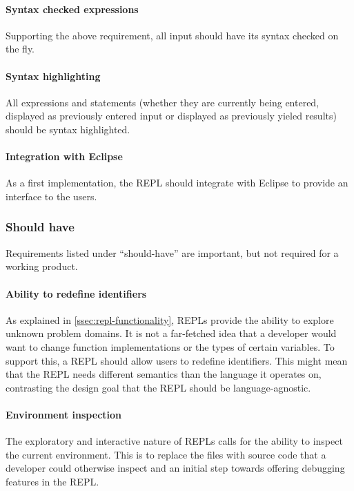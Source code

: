 \paragraph{Syntax checked expressions} Supporting the above requirement, all
input should have its syntax checked on the fly.

\paragraph{Syntax highlighting} All expressions and statements (whether they are
currently being entered, displayed as previously entered input or displayed as
previously yieled results) should be syntax highlighted.

\paragraph{Integration with Eclipse} As a first implementation, the REPL should
integrate with Eclipse to provide an interface to the users.

\subsubsection{Should have}

Requirements listed under ``should-have'' are important, but not required for
a working product.

\paragraph{Ability to redefine identifiers} As explained in \cref{ssec:repl-functionality},
REPLs provide the ability to explore unknown problem domains. It is not a
far-fetched idea that a developer would want to change function implementations
or the types of certain variables. To support this, a REPL should allow users to
redefine identifiers. This might mean that the REPL needs different semantics
than the language it operates on, contrasting the design goal that the REPL
should be language-agnostic.

\paragraph{Environment inspection} The exploratory and interactive nature of
REPLs calls for the ability to inspect the current environment. This is to
replace the files with source code that a developer could otherwise inspect and
an initial step towards offering debugging features in the REPL.

